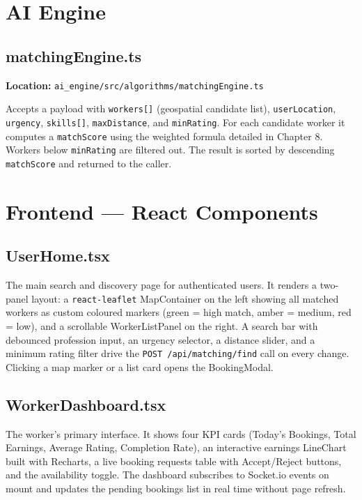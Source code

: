 \documentclass[12pt,a4paper]{report}
\begin{document}
\section{AI Engine}

\subsection{matchingEngine.ts}

\textbf{Location:} \texttt{ai\_engine/src/algorithms/matchingEngine.ts}

Accepts a payload with \texttt{workers[]} (geospatial candidate list), \texttt{userLocation}, \texttt{urgency}, \texttt{skills[]}, \texttt{maxDistance}, and \texttt{minRating}. For each candidate worker it computes a \texttt{matchScore} using the weighted formula detailed in Chapter 8. Workers below \texttt{minRating} are filtered out. The result is sorted by descending \texttt{matchScore} and returned to the caller.

\section{Frontend — React Components}

\subsection{UserHome.tsx}

The main search and discovery page for authenticated users. It renders a two-panel layout: a \texttt{react-leaflet} MapContainer on the left showing all matched workers as custom coloured markers (green = high match, amber = medium, red = low), and a scrollable WorkerListPanel on the right. A search bar with debounced profession input, an urgency selector, a distance slider, and a minimum rating filter drive the \texttt{POST /api/matching/find} call on every change. Clicking a map marker or a list card opens the BookingModal.

\subsection{WorkerDashboard.tsx}

The worker's primary interface. It shows four KPI cards (Today's Bookings, Total Earnings, Average Rating, Completion Rate), an interactive earnings LineChart built with Recharts, a live booking requests table with Accept/Reject buttons, and the availability toggle. The dashboard subscribes to Socket.io events on mount and updates the pending bookings list in real time without page refresh.
\end{document}
